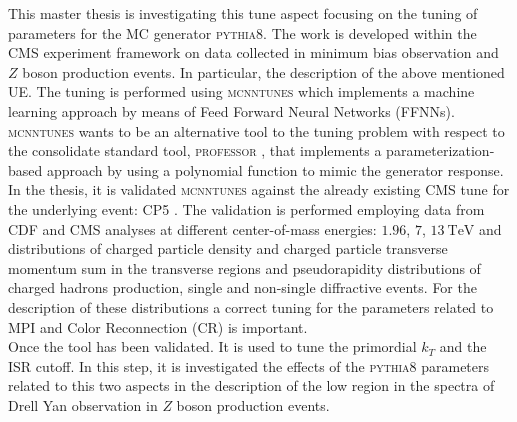 This master thesis is investigating this tune aspect focusing on the tuning of parameters for the MC generator \textsc{pythia8}. The work is developed within the CMS experiment framework on data collected in minimum bias observation and $Z$ boson production events. In particular, the description of the above mentioned UE. The tuning is performed using \textsc{mcnntunes} \cite{MCNNTUNESarticle} which implements a machine learning approach by means of Feed Forward Neural Networks (FFNNs). \textsc{mcnntunes} wants to be an alternative tool to the tuning problem with respect to the consolidate standard tool, \textsc{professor} \cite{Buckley:2009bj}, that implements a parameterization-based approach by using a polynomial function to mimic the generator response.
\\
In the thesis, it is validated \textsc{mcnntunes} against the already existing CMS tune for the underlying event: CP5 \cite{CPtunes}. The validation is performed employing data from CDF and CMS analyses at different center-of-mass energies: $1.96$, $7$, $13\ \mathrm{TeV}$ and distributions of charged particle density and charged particle transverse momentum  sum in the transverse regions and pseudorapidity distributions of charged hadrons production, single and non-single diffractive events. For the description of these distributions a correct  tuning for the parameters related to MPI and Color Reconnection (CR) is important. 
\\
Once the tool has been validated. It is used to tune the primordial $k_T$ and the ISR cutoff. In this step, it is investigated the effects of the \textsc{pythia8} parameters related to this two aspects in the description of the low region in the spectra of Drell Yan observation in $Z$ boson production events.



 
 

